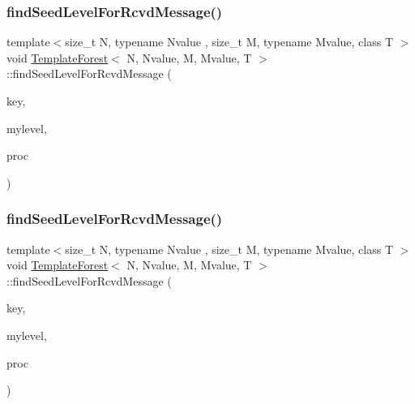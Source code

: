 \mbox{\label{classTemplateForest_a1d06e6ec854bd4490c116d95f8612bea}} 
\subsubsection{\texorpdfstring{find\+Seed\+Level\+For\+Rcvd\+Message()}{findSeedLevelForRcvdMessage()}\hspace{0.1cm}{\footnotesize\ttfamily [1/2]}}
{\footnotesize\ttfamily template$<$size\+\_\+t N, typename Nvalue , size\+\_\+t M, typename Mvalue, class T $>$ \\
void \mbox{\hyperlink{classTemplateForest}{Template\+Forest}}$<$ N, Nvalue, M, Mvalue, T $>$\+::find\+Seed\+Level\+For\+Rcvd\+Message (\begin{DoxyParamCaption}\item[{const \mbox{\hyperlink{definitions_8h_af8682350bd8bb38ee9023f7a0a310add}{morton}}$<$ N+M $>$ \&}]{key,  }\item[{\mbox{\hyperlink{definitions_8h_a69aa29b598b851b0640aa225a9e5d61d}{uint}} $\ast$}]{mylevel,  }\item[{\mbox{\hyperlink{classTree}{Tree}}$<$ M, Mvalue $>$ \&}]{proc }\end{DoxyParamCaption})}

\mbox{\label{classTemplateForest_aad29cb335e971d8441e13f04d6c16af8}} 
\subsubsection{\texorpdfstring{find\+Seed\+Level\+For\+Rcvd\+Message()}{findSeedLevelForRcvdMessage()}\hspace{0.1cm}{\footnotesize\ttfamily [2/2]}}
{\footnotesize\ttfamily template$<$size\+\_\+t N, typename Nvalue , size\+\_\+t M, typename Mvalue, class T $>$ \\
void \mbox{\hyperlink{classTemplateForest}{Template\+Forest}}$<$ N, Nvalue, M, Mvalue, T $>$\+::find\+Seed\+Level\+For\+Rcvd\+Message (\begin{DoxyParamCaption}\item[{const \mbox{\hyperlink{definitions_8h_af8682350bd8bb38ee9023f7a0a310add}{morton}}$<$ N+M $>$ \&}]{key,  }\item[{\mbox{\hyperlink{definitions_8h_a69aa29b598b851b0640aa225a9e5d61d}{uint}} $\ast$}]{mylevel,  }\item[{\mbox{\hyperlink{classFullTree}{Full\+Tree}}$<$ M, Mvalue $>$ \&}]{proc }\end{DoxyParamCaption})}

